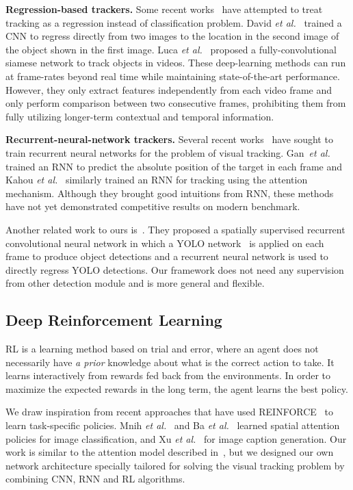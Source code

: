 \documentclass[10pt,twocolumn,letterpaper]{article}
\begin{document}
\textbf{Regression-based trackers.} Some recent works~\cite{held2016learning,bertinetto2016fully} have attempted to treat tracking as a regression instead of classification problem. David \emph{et al.}~\cite{held2016learning} trained a CNN to regress directly from two images to the location in the second image of the object shown in the first image. Luca \emph{et al.}~\cite{bertinetto2016fully} proposed a fully-convolutional siamese network to track objects in videos. These deep-learning methods can run at frame-rates beyond real time while maintaining state-of-the-art performance. However, they only extract features independently  from each video frame and only perform comparison between two consecutive frames, prohibiting them  from fully utilizing longer-term contextual and temporal information.

\textbf{Recurrent-neural-network trackers.} Several recent works~\cite{kahou2015ratm,gan2015first} have sought to train recurrent neural networks for the problem of visual tracking. Gan~\emph{et al.}~\cite{gan2015first} trained an RNN to predict the absolute position of the target in each frame and Kahou \emph{et al.}~\cite{kahou2015ratm} similarly trained an RNN for tracking using the attention mechanism. Although they brought good intuitions from RNN, these methods have not yet demonstrated competitive results on modern benchmark. 

Another related work to ours is~\cite{ning2016spatially}. They proposed a spatially supervised recurrent convolutional neural network in which a YOLO network~\cite{redmon2016you} is applied on each frame to produce object detections and a recurrent neural network is used to directly regress YOLO detections. Our framework does not need any supervision from other detection module and is more general and flexible.

\subsection{Deep Reinforcement Learning}

RL is a learning method based on trial and error, where an agent does not necessarily have {\em a prior} knowledge about what is the correct action to take. It learns interactively from rewards fed back from the environments. In order to maximize the expected rewards in the long term, the agent learns the best policy.

We draw inspiration from recent approaches that have used REINFORCE~\cite{williams1992simple} to learn task-specific policies. Mnih \emph{et al.}~\cite{mnih2014recurrent} and Ba \emph{et al.}~\cite{ba2014multiple} learned spatial attention policies for image classification, and Xu \emph{et al.}~\cite{xu2015show} for image caption generation. Our work is similar to the attention model described in~\cite{mnih2014recurrent}, but we designed our own network architecture specially tailored for solving the visual tracking problem by combining CNN, RNN and RL algorithms.
\end{document}
